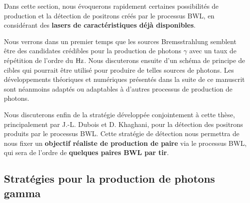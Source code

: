 \begin{refsection}
Dans cette section, nous évoquerons rapidement certaines possibilités de production et la détection de positrons créés par le processus BWL, en considérant des \textbf{lasers de caractéristiques déjà disponibles}.

Nous verrons dans un premier temps que les sources Bremsstrahlung semblent être des candidates crédibles pour la production de photons $\gamma$ avec un taux de répétition de l'ordre du $\rm Hz$. Nous discuterons ensuite d'un schéma de principe de cibles qui pourrait être utilisé pour produire de telles sources de photons. Les développements théoriques et numériques présentés dans la suite de ce manuscrit sont néanmoins adaptés ou adaptables à d'autres processus de production de photons.

Nous discuterons enfin de la stratégie développée conjointement à cette thèse, principalement par J.-L. Dubois et D. Khaghani, pour la détection des positrons produits par le processus BWL. Cette stratégie de détection nous permettra de nous fixer un \textbf{objectif réaliste de production de paire} via le processus BWL, qui sera de l'ordre de \textbf{quelques paires BWL par tir}.

\subsection{Stratégies pour la production de photons gamma}



\end{refsection}
